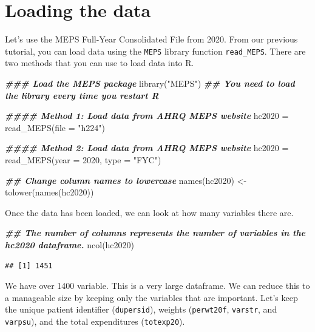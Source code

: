 \documentclass[
]{book}
\newenvironment{Shaded}{\begin{snugshade}}{\end{snugshade}}
\newcommand{\AttributeTok}[1]{\textcolor[rgb]{0.77,0.63,0.00}{#1}}
\newcommand{\DecValTok}[1]{\textcolor[rgb]{0.00,0.00,0.81}{#1}}
\newcommand{\DocumentationTok}[1]{\textcolor[rgb]{0.56,0.35,0.01}{\textbf{\textit{#1}}}}
\newcommand{\FunctionTok}[1]{\textcolor[rgb]{0.00,0.00,0.00}{#1}}
\newcommand{\NormalTok}[1]{#1}
\newcommand{\OtherTok}[1]{\textcolor[rgb]{0.56,0.35,0.01}{#1}}
\newcommand{\StringTok}[1]{\textcolor[rgb]{0.31,0.60,0.02}{#1}}
\theoremstyle{definition}
\theoremstyle{definition}
\theoremstyle{definition}
\theoremstyle{definition}
\theoremstyle{remark}
\begin{document}
\hypertarget{loading-the-data}{%
\section{Loading the data}\label{loading-the-data}}

Let's use the MEPS Full-Year Consolidated File from 2020. From our previous tutorial, you can load data using the \texttt{MEPS} library function \texttt{read\_MEPS}. There are two methods that you can use to load data into R.

\begin{Shaded}
\begin{Highlighting}[]
\DocumentationTok{\#\#\# Load the MEPS package}
\FunctionTok{library}\NormalTok{(}\StringTok{"MEPS"}\NormalTok{) }\DocumentationTok{\#\# You need to load the library every time you restart R}

\DocumentationTok{\#\#\#\# Method 1: Load data from AHRQ MEPS website}
\NormalTok{hc2020 }\OtherTok{=} \FunctionTok{read\_MEPS}\NormalTok{(}\AttributeTok{file =} \StringTok{"h224"}\NormalTok{)}

\DocumentationTok{\#\#\#\# Method 2: Load data from AHRQ MEPS website}
\NormalTok{hc2020 }\OtherTok{=} \FunctionTok{read\_MEPS}\NormalTok{(}\AttributeTok{year =} \DecValTok{2020}\NormalTok{, }\AttributeTok{type =} \StringTok{"FYC"}\NormalTok{)}

\DocumentationTok{\#\# Change column names to lowercase}
\FunctionTok{names}\NormalTok{(hc2020) }\OtherTok{\textless{}{-}} \FunctionTok{tolower}\NormalTok{(}\FunctionTok{names}\NormalTok{(hc2020))}
\end{Highlighting}
\end{Shaded}

Once the data has been loaded, we can look at how many variables there are.

\begin{Shaded}
\begin{Highlighting}[]
\DocumentationTok{\#\# The number of columns represents the number of variables in the hc2020 dataframe. }
\FunctionTok{ncol}\NormalTok{(hc2020)}
\end{Highlighting}
\end{Shaded}

\begin{verbatim}
## [1] 1451
\end{verbatim}

We have over 1400 variable. This is a very large dataframe. We can reduce this to a manageable size by keeping only the variables that are important. Let's keep the unique patient identifier (\texttt{dupersid}), weights (\texttt{perwt20f}, \texttt{varstr}, and \texttt{varpsu}), and the total expenditures (\texttt{totexp20}).
\end{document}
